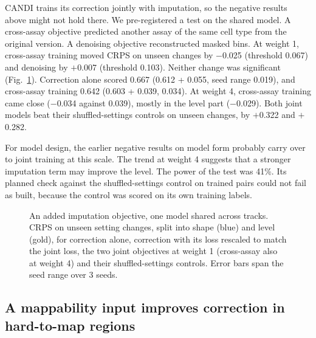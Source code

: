 \documentclass[pdflatex,sn-mathphys-num]{sn-jnl}
\newcommand{\lit}[1]{#1}
\newcommand{\jAlone}{0.667}
\newcommand{\jAloneOS}{0.612}
\newcommand{\jAloneS}{0.019}
\newcommand{\jAloneSE}{0.055}
\newcommand{\jDnd}{\ensuremath{+}0.007}
\newcommand{\jDndBar}{0.103}
\newcommand{\jDntw}{\ensuremath{+}0.282}
\newcommand{\jX}{0.642}
\newcommand{\jXOS}{0.603}
\newcommand{\jXS}{0.034}
\newcommand{\jXSE}{0.039}
\newcommand{\jXd}{\ensuremath{-}0.025}
\newcommand{\jXdBar}{0.067}
\newcommand{\jXfourd}{\ensuremath{-}0.034}
\newcommand{\jXfourdBar}{0.039}
\newcommand{\jXfourdSE}{\ensuremath{-}0.029}
\newcommand{\jXtw}{\ensuremath{+}0.322}
\newcommand{\powJoint}{41}
\begin{document}
CANDI trains its correction jointly with imputation, so the negative results above might not
hold there. We pre-registered a test on the shared model. A cross-assay objective predicted
another assay of the same cell type from the original version. A denoising objective
reconstructed masked bins. At weight \lit{1}, cross-assay training moved CRPS on unseen changes
by \jXd{} (threshold \jXdBar{}) and denoising by \jDnd{} (threshold \jDndBar{}). Neither change
was significant (Fig.~\ref{fig:joint}). Correction alone scored \jAlone{} (\jAloneOS{} +
\jAloneSE{}, seed range \jAloneS{}), and cross-assay training \jX{} (\jXOS{} + \jXSE{}, \jXS{}).
At weight \lit{4}, cross-assay training came close (\jXfourd{} against \jXfourdBar{}), mostly
in the level part (\jXfourdSE{}). Both joint models beat their shuffled-settings controls on
unseen changes, by \jXtw{} and \jDntw{}.

For model design, the earlier negative results on model form probably carry over to joint
training at this scale. The trend at weight \lit{4} suggests that a stronger imputation term may
improve the level. The power of the test was \powJoint\%. Its planned check against the
shuffled-settings control on trained pairs could not fail as built, because the control was
scored on its own training labels.

\begin{figure}[t]
\centering
{}
\caption{An added imputation objective, one model shared across tracks. CRPS on unseen
setting changes, split into shape (blue) and level (gold), for correction alone, correction
with its loss rescaled to match the joint loss, the two joint objectives at weight \lit{1}
(cross-assay also at weight \lit{4}) and their shuffled-settings controls. Error bars span the
seed range over \lit{3} seeds.}\label{fig:joint}
\end{figure}

\subsection{A mappability input improves correction in hard-to-map regions}\label{sec:r11}
\end{document}
